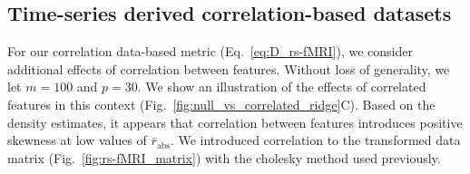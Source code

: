 \documentclass[10pt,letterpaper]{article}
\begin{document}
\subsection*{Time-series derived correlation-based datasets}

For our correlation data-based metric (Eq.~\ref{eq:D_rs-fMRI}), we consider additional effects of correlation between features. Without loss of generality, we let $m=100$ and $p=30$. We show an illustration of the effects of correlated features in this context (Fig.~\ref{fig:null_vs_correlated_ridge}C). Based on the density estimates, it appears that correlation between features introduces positive skewness at low values of $\bar{r}_\text{abs}$. We introduced correlation to the transformed data matrix (Fig.~\ref{fig:rs-fMRI_matrix}) with the cholesky method used previously.
%

\end{document}
